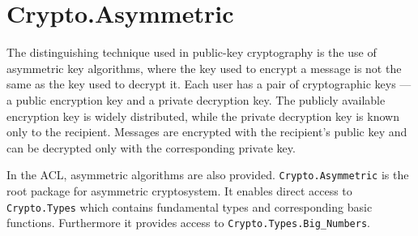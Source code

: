\chapter{Crypto.Asymmetric}
The distinguishing technique used in public-key cryptography is the
use of asymmetric key algorithms, where the key used to encrypt a
message is not the same as the key used to decrypt it. Each user has a
pair of cryptographic keys — a public encryption key and a private
decryption key. The publicly available encryption key is widely
distributed, while the private decryption key is known only to the
recipient. Messages are encrypted with the recipient's public key and
can be decrypted only with the corresponding private key.

In the ACL, asymmetric algorithms are also
provided. \texttt{Crypto.Asymmetric} is the root package for
asymmetric cryptosystem. It enables direct access to
\texttt{Crypto.Types} which contains fundamental types and
corresponding basic functions. Furthermore it provides access to
\texttt{Crypto.Types.Big\_Numbers}.
